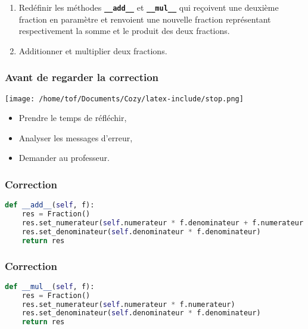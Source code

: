 \documentclass[svgnames,11pt]{beamer}
\begin{document}
\begin{frame}
    \frametitle{}

    \begin{activite}
        \begin{enumerate}
            \item Redéfinir les méthodes \textbf{\texttt{\_\_add\_\_}} et \textbf{\texttt{\_\_mul\_\_}} qui reçoivent une deuxième fraction en paramètre et renvoient une nouvelle fraction représentant respectivement la somme et le produit des deux
        fractions.
        \item Additionner et multiplier deux fractions.
        \end{enumerate}
    \end{activite}

\end{frame}
\begin{frame}
    \frametitle{Avant de regarder la correction}
\begin{center}
    \centering
    \texttt{[image: /home/tof/Documents/Cozy/latex-include/stop.png]}
    \end{center}
{\Large
    \begin{itemize}
        \item Prendre le temps de réfléchir,
        \item Analyser les messages d'erreur,
        \item Demander au professeur.
    \end{itemize}
}
\end{frame}
\begin{frame}[fragile]
    \frametitle{Correction}

\begin{center}
\begin{lstlisting}[language=Python , basicstyle=\ttfamily\small, xleftmargin=2em, xrightmargin=1em]
def __add__(self, f):
    res = Fraction()
    res.set_numerateur(self.numerateur * f.denominateur + f.numerateur * self.denominateur)
    res.set_denominateur(self.denominateur * f.denominateur)
    return res
\end{lstlisting}
\label{CODE}
\end{center}   

\end{frame}
\begin{frame}[fragile]
    \frametitle{Correction}

\begin{center}
\begin{lstlisting}[language=Python , basicstyle=\ttfamily\small, xleftmargin=2em, xrightmargin=1em]
def __mul__(self, f):
    res = Fraction()
    res.set_numerateur(self.numerateur * f.numerateur)
    res.set_denominateur(self.denominateur * f.denominateur)
    return res
\end{lstlisting}
\label{CODE}
\end{center}

\end{frame}
\end{document}

